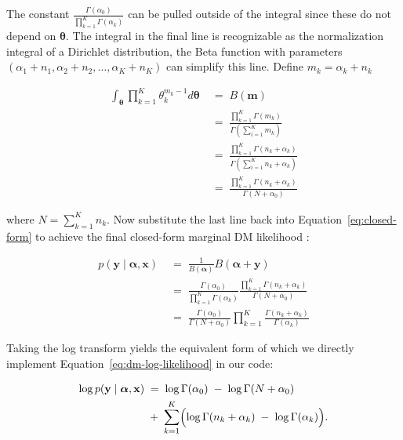 The constant \(\frac{\Gamma(\alpha_0)}{\prod_{k=1}^K \Gamma(\alpha_k)}\) can be pulled outside of the integral since these do not depend on \(\boldsymbol{\theta}\). The integral in the final line is recognizable as the normalization integral of a Dirichlet distribution, the Beta function with parameters \((\alpha_1 + n_1, \alpha_2 + n_2, \dots, \alpha_K + n_K)\) can simplify this line. Define \(m_k = \alpha_k + n_k\)

\begin{align*}
        \int_{\boldsymbol{\theta}} \prod_{k=1}^K \theta_k^{m_k - 1} d\boldsymbol{\theta}
    \;&=\;
        B(\mathbf{m})\\
    \;&=\;
        \frac{\prod_{k=1}^K \Gamma(m_k)}{\Gamma(\sum_{i=1}^K m_k)}\\
    \;&=\;
        \frac{\prod_{k=1}^K \Gamma(n_k + \alpha_k)}{\Gamma(\sum_{i=1}^K n_k + \alpha_k )} \\
    \;&=\;
        \frac{\prod_{k=1}^K \Gamma(n_k + \alpha_k)}{\Gamma(N + \alpha_0)} 
\end{align*}

where \(N = \sum_{k=1}^K n_k\). Now substitute the last line back into Equation~\ref{eq:closed-form} to achieve the final closed-form marginal DM likelihood \parencite{wiki:dirichlet-multinomial}:

\begin{equation}
    \begin{aligned}
    \label{eq:dm-likelihood}
    p(\mathbf{y} \mid  \boldsymbol{\alpha}, \mathbf{x}) 
    \;&=\;
    \frac{1}{B(\boldsymbol{\alpha})}B(\boldsymbol{\alpha} + \mathbf{y}) \\
    \;&=\;
    \frac{\Gamma(\alpha_0)}{\prod_{k=1}^K \Gamma(\alpha_k)}
    \frac{\prod_{k=1}^K \Gamma(n_k + \alpha_k)}{\Gamma(N + \alpha_0)} \\
    \;&=\;
    \frac{\Gamma(\alpha_0)}{\Gamma(N + \alpha_0)}
    \prod_{k=1}^K  \frac{\Gamma(n_k + \alpha_k)}{\Gamma(\alpha_k)}
    \end{aligned}
\end{equation}

Taking the log transform yields the equivalent form of which we directly implement Equation~\ref{eq:dm-log-likelihood} in our code: 

\begin{equation}
    \begin{aligned}
    \label{eq:dm-log-likelihood}
    \log p(\mathbf{y}\mid \boldsymbol{\alpha}, \mathbf{x})
    \;&=\;
    \log \Gamma(\alpha_0)
    \;-\;
    \log \Gamma(N + \alpha_0)\\
    \;&+\;
    \sum_{k=1}^K \Bigl(\log \Gamma(n_k + \alpha_k) \;-\; \log \Gamma(\alpha_k)
    \Bigr).
    \end{aligned}
\end{equation}

